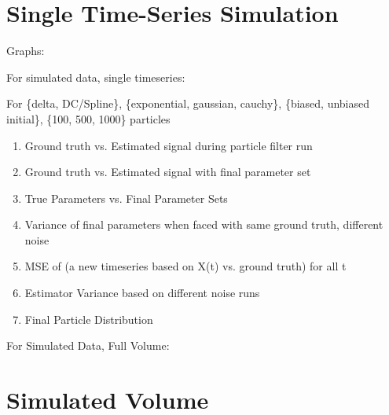 \section{Single Time-Series Simulation}

Graphs: 

For simulated data, single timeseries:

For \{delta, DC/Spline\}, \{exponential, gaussian, cauchy\}, \{biased, unbiased initial\},
\{100, 500, 1000\} particles
\begin{enumerate}
\item Ground truth vs. Estimated signal during particle filter run
\item Ground truth vs. Estimated signal with final parameter set
\item True Parameters vs. Final Parameter Sets
\item Variance of final parameters when faced with same ground truth, different noise
\item MSE of (a new timeseries based on X(t) vs. ground truth) for all t
\item Estimator Variance based on different noise runs
\item Final Particle Distribution
\end{enumerate}

For Simulated Data, Full Volume:

\section{Simulated Volume}

